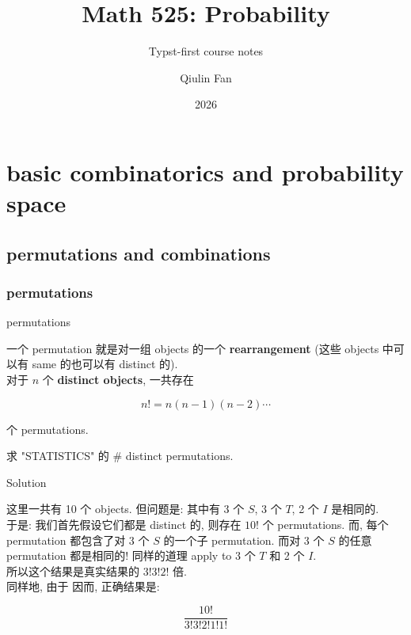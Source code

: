 \documentclass{qlnotes-export}
\title{Math 525: Probability}
\subtitle{Typst-first course notes}
\author{Qiulin Fan}
\date{2026}
\begin{document}
\frontmatter
\maketitle
\tableofcontents

\mainmatter
\chapter{basic combinatorics and probability space}\label{basic-combinatorics-and-probability-space}

\section{permutations and combinations}\label{permutations-and-combinations}

\subsection{permutations}\label{permutations}

\begin{definition}{permutations}\label{def-01-combinatorics-prob-space-permutations}

一个 permutation 就是对一组 objects 的一个 \textbf{rearrangement} (这些 objects 中可以有 same 的也可以有 distinct 的).\\
对于 \(n\) 个 \textbf{distinct objects}, 一共存在

\[n! = n(n - 1)(n - 2)\cdots\]

个 permutations.

\end{definition}

\begin{example}\label{ex-01-combinatorics-prob-space-example-001}

求 "STATISTICS" 的 \# distinct permutations.

\end{example}

\begin{qlsolution}{Solution}

这里一共有 10 个 objects. 但问题是: 其中有 3 个 \(S\), 3 个 \(T\), 2 个 \(I\) 是相同的.\\
于是: 我们首先假设它们都是 distinct 的, 则存在 \(10!\) 个 permutations. 而, 每个 permutation 都包含了对 3 个 \(S\) 的一个子 permutation. 而对 3 个 \(S\) 的任意 permutation 都是相同的! 同样的道理 apply to 3 个 \(T\) 和 2 个 \(I\).\\
所以这个结果是真实结果的 \(3!3!2!\) 倍.\\
同样地, 由于 因而, 正确结果是:

\[\frac{10!}{3!3!2!1!1!}\]

\end{qlsolution}
\end{document}
